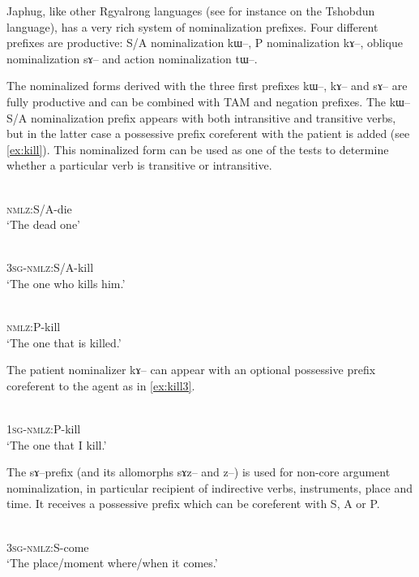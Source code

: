 \documentclass[oldfontcommands,oneside,a4paper,11pt]{article}
\newcommand{\ipa}[1]{{\phon #1}} %
\begin{document}
Japhug, like other Rgyalrong languages (see for instance \citealt{jackson03caodeng} on the Tshobdun language), has a very rich system of nominalization prefixes. Four different prefixes are productive:   S/A nominalization \ipa{kɯ--},   P nominalization \ipa{kɤ--},   oblique nominalization \ipa{sɤ--}  and   action nominalization \ipa{tɯ--}.  

 
The nominalized forms derived with the three first prefixes \ipa{kɯ--}, \ipa{kɤ}-- and \ipa{sɤ}-- are fully productive and can be combined with TAM and negation prefixes.  The \ipa{kɯ--} S/A nominalization prefix appears with both intransitive and transitive verbs, but in the latter case a possessive prefix  coreferent with the patient is added (see \ref{ex:kill}). This nominalized form can be used as one of the tests to determine whether a particular verb is transitive or intransitive.  

 \begin{exe}
\ex
\gll \ipa{kɯ-si}    \\
  \textsc{nmlz}:S/A-die \\
 \glt  `The dead one'
 
\ex \label{ex:kill}
\gll \ipa{ɯ-kɯ-sat}    \\
  \textsc{3sg}-\textsc{nmlz}:S/A-kill \\
 \glt  `The one who kills him.'
 

\ex \label{ex:kill2}
\gll \ipa{kɤ-sat}    \\
   \textsc{nmlz}:P-kill \\
 \glt  `The one that is killed.'
 \end{exe}
 
  The patient nominalizer \ipa{kɤ--} can appear with an optional possessive prefix coreferent to the agent as in \ref{ex:kill3}.
  
  \begin{exe}
\ex \label{ex:kill3}
\gll \ipa{a-kɤ-sat}    \\
   \textsc{1sg-nmlz}:P-kill \\
 \glt  `The one that I kill.'
 \end{exe}

The \ipa{sɤ}--prefix (and its allomorphs \ipa{sɤz}-- and \ipa{z}--) is used for non-core argument nominalization, in particular   recipient of indirective verbs, instruments, place and time. It receives a possessive prefix  which can be coreferent with S, A or P.

   \begin{exe}
\ex \label{ex:come}
\gll \ipa{ɯ-sɤ-ɣi}    \\
   \textsc{3sg-nmlz}:S-come \\
 \glt  `The place/moment where/when it comes.'
 \end{exe}
 
\end{document}
